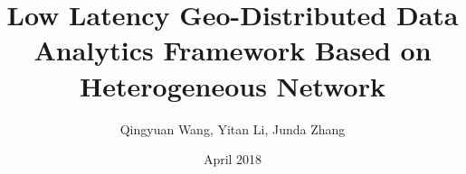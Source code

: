 \documentclass[11pt]{article}   %
\begin{document}
\title{\textbf{Low Latency Geo-Distributed Data Analytics Framework Based on Heterogeneous Network}}
\author{Qingyuan Wang, Yitan Li, Junda Zhang}
\date{April 2018}    %
\maketitle


%








\newpage




\end{document}

